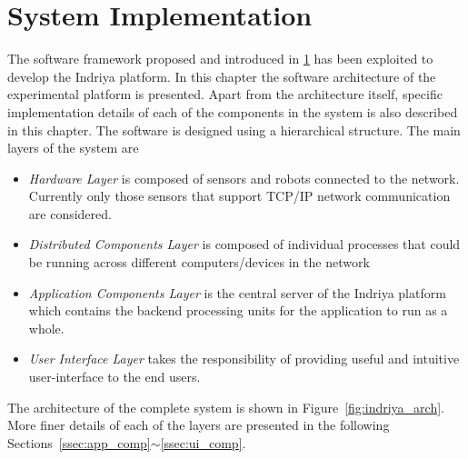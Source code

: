 
\chapter{System Implementation} %

\label{Chapter4} %

The software framework proposed and introduced in \ref{Chapter4} has been exploited to develop the Indriya platform. In this chapter the software architecture of the experimental platform is presented. Apart from the architecture itself, specific implementation details of each of the components in the system is also described in this chapter.  The software is designed using a hierarchical structure. The main layers of the system are
\begin{itemize}
\item \emph{Hardware Layer} is composed of sensors and robots connected to the network. Currently only those sensors that support TCP/IP network communication are considered.
\item \emph{Distributed Components Layer} is composed of individual processes that could be running across different computers/devices in the network
\item \emph{Application Components Layer} is the central server of the Indriya platform which contains the backend processing units for the application to run as a whole.
\item \emph{User Interface Layer} takes the responsibility of providing useful and intuitive user-interface to the end users.
\end{itemize}
The architecture of the complete system is shown in Figure~\ref{fig:indriya_arch}. More finer details of each of the layers are presented in the following Sections~\ref{ssec:app_comp}$\sim$\ref{ssec:ui_comp}.
